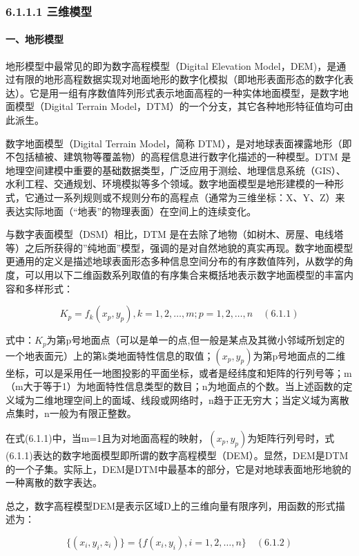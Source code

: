 \subsubsection{6.1.1.1 三维模型}\label{ux4e09ux7ef4ux6a21ux578b}

\paragraph{一、地形模型}\label{ux4e00ux5730ux5f62ux6a21ux578b}

地形模型中最常见的即为数字高程模型（Digital Elevation
Model，DEM)，是通过有限的地形高程数据实现对地面地形的数字化模拟（即地形表面形态的数字化表达）。它是用一组有序数值阵列形式表示地面高程的一种实体地面模型，是数字地面模型（Digital
Terrain Model，DTM）的一个分支，其它各种地形特征值均可由此派生。

数字地面模型（Digital Terrain Model，简称
DTM），是对地球表面裸露地形（即不包括植被、建筑物等覆盖物）的高程信息进行数字化描述的一种模型。DTM
是地理空间建模中重要的基础数据类型，广泛应用于测绘、地理信息系统（GIS）、水利工程、交通规划、环境模拟等多个领域。数字地面模型是地形建模的一种形式，它通过一系列规则或不规则分布的高程点（通常为三维坐标：X、Y、Z）来表达实际地面（``地表''的物理表面）在空间上的连续变化。

与数字表面模型（DSM）相比，DTM
是在去除了地物（如树木、房屋、电线塔等）之后所获得的''纯地面''模型，强调的是对自然地貌的真实再现。数字地面模型更通用的定义是描述地球表面形态多种信息空间分布的有序数值阵列，从数学的角度，可以用以下二维函数系列取值的有序集合来概括地表示数字地面模型的丰富内容和多样形式：

\[K_p = f_k(x_p, y_p), k=1,2,\ldots,m; p=1,2,\ldots,n \quad (6.1.1)\]

式中：\(K_p\)为第p号地面点（可以是单一的点,但一般是某点及其微小邻域所划定的一个地表面元）上的第k类地面特性信息的取值；\((x_p, y_p)\)为第p号地面点的二维坐标，可以是采用任一地图投影的平面坐标，或者是经纬度和矩阵的行列号等；m（m大于等于1）为地面特性信息类型的数目；n为地面点的个数。当上述函数的定义域为二维地理空间上的面域、线段或网络时，n趋于正无穷大；当定义域为离散点集时，n一般为有限正整数。

在式(6.1.1)中，当m=1且为对地面高程的映射，\((x_p, y_p)\)为矩阵行列号时，式(6.1.1)表达的数字地面模型即所谓的数字高程模型（DEM）。显然，DEM是DTM的一个子集。实际上，DEM是DTM中最基本的部分，它是对地球表面地形地貌的一种离散的数字表达。

总之，数字高程模型DEM是表示区域D上的三维向量有限序列，用函数的形式描述为：

\[\{(x_i, y_i, z_i)\} = \{f(x_i, y_i), i=1,2,\ldots,n\} \quad (6.1.2)\]

